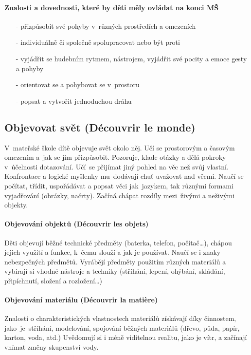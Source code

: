 				\paragraph{Znalosti a dovednosti, které by děti měly ovládat na konci MŠ}

				\begin{itemize}
					\setlength\itemsep{-2mm}
					\item[-] přizpůsobit své pohyby v různých prostředích a omezeních
					\item[-] individuálně či společně spolupracovat nebo být proti
					\item[-] vyjádřit se hudebním rytmem, nástrojem, vyjádřit své pocity a emoce gesty a pohyby
					\item[-] orientovat se a pohybovat se v prostoru
					\item[-] popsat a vytvořit jednoduchou dráhu
				\end{itemize}

		\subsection{Objevovat svět (Découvrir le monde)}
			V mateřské škole dítě objevuje svět okolo něj. Učí se prostorovým a časovým omezením a jak se jim přizpůsobit. Pozoruje, klade otázky a dělá pokroky v účelnosti dotazování. Učí se přijímat jiný pohled na věc než svůj vlastní.  Konfrontace a logické myšlenky mu dodávají chuť uvažovat nad věcmi. Naučí se počítat, třídit, uspořádávat a popsat věci jak jazykem, tak různými formami vyjadřování (obrázky, načrty). Začíná chápat rozdíly mezi živými a neživými objekty.

			\paragraph{Objevování objektů (Découvrir les objets)}
				Děti objevují běžné technické předměty (baterka, telefon, počítač…), chápou jejich využití a funkce, k čemu slouží a jak je používat. Naučí se i znaky nebezpečných předmětů.
				Vyrábějí předměty použitím různých materiálů a vybírají si vhodné nástroje a techniky (stříhání, lepení, ohýbání, skládání, připíchnutí, složení a rozložení…)
			\paragraph{Objevování materiálu (Découvrir la matière)}
				Znalosti o charakteristických vlastnostech materiálů získávají díky činnostem, jako je stříhání, modelování, spojování běžných materiálů (dřevo, půda, papír, karton, voda, atd.)
				Uvědomují si i méně viditelnou realitu, jako je vítr, a začínají vnímat změny skupenství vody. 
